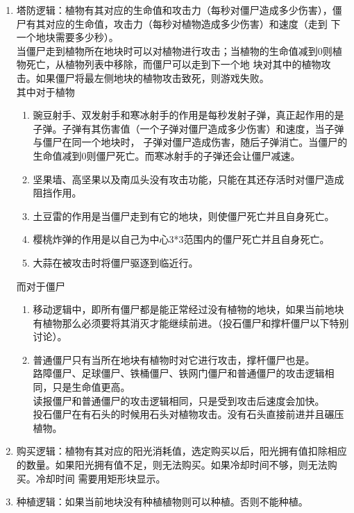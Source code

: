 \documentclass[12pt,a4paper,UTF8]{article}
\begin{document}
        \begin{enumerate}
          \item 塔防逻辑：植物有其对应的生命值和攻击力（每秒对僵尸造成多少伤害），僵尸有其对应的生命值，攻击力（每秒对植物造成多少伤害）和速度（走到
          下一个地块需要多少秒）。\\
                        当僵尸走到植物所在地块时可以对植物进行攻击；当植物的生命值减到0则植物死亡，从植物列表中移除，而僵尸可以走到下一个地
            块对其中的植物攻击。如果僵尸将最左侧地块的植物攻击致死，则游戏失败。\\
            其中对于植物
          \begin{enumerate}
            \item 豌豆射手、双发射手和寒冰射手的作用是每秒发射子弹，真正起作用的是子弹。子弹有其伤害值（一个子弹对僵尸造成多少伤害）和速度，当子弹与僵尸在同一个地块时，
            子弹对僵尸造成伤害，随后子弹消亡。当僵尸的生命值减到0则僵尸死亡。而寒冰射手的子弹还会让僵尸减速。
            \item 坚果墙、高坚果以及南瓜头没有攻击功能，只能在其还存活时对僵尸造成阻挡作用。
            \item 土豆雷的作用是当僵尸走到有它的地块，则使僵尸死亡并且自身死亡。
            \item 樱桃炸弹的作用是以自己为中心3*3范围内的僵尸死亡并且自身死亡。
            \item 大蒜在被攻击时将僵尸驱逐到临近行。
          \end{enumerate}
          而对于僵尸
          \begin{enumerate}
            \item 移动逻辑中，即所有僵尸都是能正常经过没有植物的地块，如果当前地块有植物那么必须要将其消灭才能继续前进。（投石僵尸和撑杆僵尸以下特别讨论）。
            \item 普通僵尸只有当所在地块有植物时对它进行攻击，撑杆僵尸也是。\\
                  路障僵尸、足球僵尸、铁桶僵尸、铁网门僵尸和普通僵尸的攻击逻辑相同，只是生命值更高。\\
                  读报僵尸和普通僵尸的攻击逻辑相同，只是受到攻击后速度会加快。\\
                  投石僵尸在有石头的时候用石头对植物攻击。没有石头直接前进并且碾压植物。
          \end{enumerate}

          \item 购买逻辑：植物有其对应的阳光消耗值，选定购买以后，阳光拥有值扣除相应的数量。如果阳光拥有值不足，则无法购买。如果冷却时间不够，则无法购买。冷却时间
          需要用矩形块显示。
          \item 种植逻辑：如果当前地块没有种植植物则可以种植。否则不能种植。
          
        \end{enumerate}
    
\end{document}
